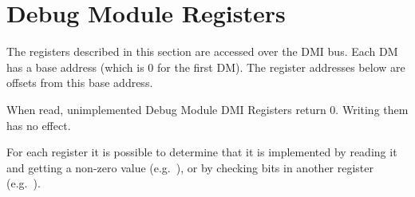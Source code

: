 \section{Debug Module Registers} \label{dmdebbus}

The registers described in this section are accessed over the DMI bus.  Each DM
has a base address (which is 0 for the first DM). The register addresses below
are offsets from this base address.

When read, unimplemented Debug Module DMI Registers return 0. Writing them has
no effect.

For each register it is possible to determine that it is implemented by reading
it and getting a non-zero value (e.g.\ \Rsbcs), or by checking bits in another
register (e.g.\ \Fprogbufsize).



